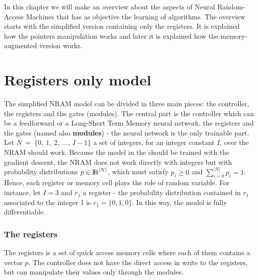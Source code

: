 \label{chap:nram}
In this chapter we will make an overview about the aspects of Neural Random-Access Machines \cite{NRAM:2016} that has as objective the learning of algorithms. The overview starts with the simplified version containing only the registers. It is explained how the pointers manipulation works and later it is explained how the memory-augmented version works.

\section{Registers only model}
The simplified NRAM model can be divided in three main pieces: the controller, the registers and the gates (modules). The central part is the controller which can be a feedforward or a Long-Short Term Memory neural network, the registers and the gates (named also \textbf{modules}) - the neural network is the only trainable part. \newline \newline 
Let $N\ =\ \{0,\ 1,\ 2,\ \dots,\ I - 1\}$ a set of integers, for an integer constant $I$, over the NRAM should work. Because the model in the \cite{NRAM:2016} should be trained with the gradient descent, the NRAM does not work directly with integers but with probability distributions $p \in \textrm{I\!R}^{|N|}$, which must satisfy $p_{i} \geq 0$ and $\sum\limits_{i = 0}^{|N|} p_{i} = 1$. Hence, each register or memory cell plays the role of random variable. For instance, let $I = 3$ and $r_1$ a register - the probability distribution contained in $r_1$ associated to the integer 1 is $r_1 = \{0, 1, 0\}$. In this way, the model is fully differentiable.

\subsubsection*{The registers}
The registers is a set of quick access memory cells where each of them contains a vector $p$. The controller does not have the direct access in write to the registers, but can manipulate their values only through the modules.

